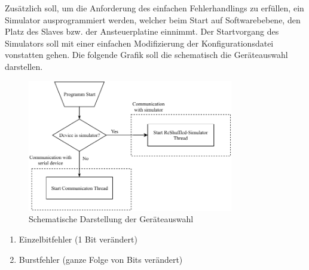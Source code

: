 Zusätzlich soll, um die Anforderung des einfachen Fehlerhandlings zu erfüllen, ein Simulator ausprogrammiert werden, welcher beim Start auf Softwarebebene, den Platz des Slaves bzw. der Ansteuerplatine einnimmt.
Der Startvorgang des Simulators soll mit einer einfachen Modifizierung der Konfigurationsdatei vonstatten gehen.
Die folgende Grafik soll die schematisch die Geräteauswahl darstellen.
\begin{figure}[H]
    \centering
    \includegraphics[width=0.8\textwidth]{fig/ainf/DeviceSelection}
    \caption{Schematische Darstellung der Geräteauswahl}
\end{figure}
\begin{enumerate}
    \item Einzelbitfehler (1 Bit verändert)
    \item Burstfehler (ganze Folge von Bits verändert)
\end{enumerate}
